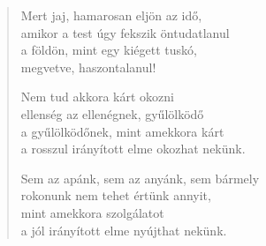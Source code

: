 \begin{verse}
 Mert jaj, hamarosan eljön az idő,\\
amikor a test úgy fekszik öntudatlanul\\
a földön, mint egy kiégett tuskó,\\
megvetve, haszontalanul!

 Nem tud akkora kárt okozni\\
ellenség az ellenégnek, gyűlölködő\\
a gyűlölködőnek, mint amekkora kárt\\
a rosszul irányított elme okozhat nekünk.

\newpage

 Sem az apánk, sem az anyánk, sem bármely\\
rokonunk nem tehet értünk annyit,\\
mint amekkora szolgálatot\\
a jól irányított elme nyújthat nekünk.

\end{verse}
